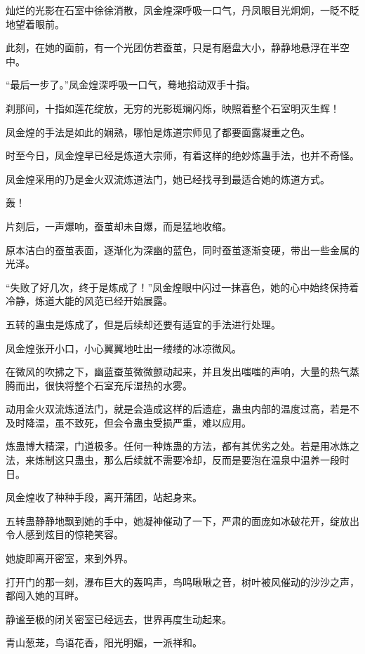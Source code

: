 
\begin{this_body}

灿烂的光影在石室中徐徐消散，凤金煌深呼吸一口气，丹凤眼目光炯炯，一眨不眨地望着眼前。

此刻，在她的面前，有一个光团仿若蚕茧，只是有磨盘大小，静静地悬浮在半空中。

“最后一步了。”凤金煌深呼吸一口气，蓦地掐动双手十指。

刹那间，十指如莲花绽放，无穷的光影斑斓闪烁，映照着整个石室明灭生辉！

凤金煌的手法是如此的娴熟，哪怕是炼道宗师见了都要面露凝重之色。

时至今日，凤金煌早已经是炼道大宗师，有着这样的绝妙炼蛊手法，也并不奇怪。

凤金煌采用的乃是金火双流炼道法门，她已经找寻到最适合她的炼道方式。

轰！

片刻后，一声爆响，蚕茧却未自爆，而是猛地收缩。

原本洁白的蚕茧表面，逐渐化为深幽的蓝色，同时蚕茧逐渐变硬，带出一些金属的光泽。

“失败了好几次，终于是炼成了！”凤金煌眼中闪过一抹喜色，她的心中始终保持着冷静，炼道大能的风范已经开始展露。

五转的蛊虫是炼成了，但是后续却还要有适宜的手法进行处理。

凤金煌张开小口，小心翼翼地吐出一缕缕的冰凉微风。

在微风的吹拂之下，幽蓝蚕茧微微颤动起来，并且发出嗤嗤的声响，大量的热气蒸腾而出，很快将整个石室充斥湿热的水雾。

动用金火双流炼道法门，就是会造成这样的后遗症，蛊虫内部的温度过高，若是不及时降温，虽不致死，但会令蛊虫受损严重，难以应用。

炼蛊博大精深，门道极多。任何一种炼蛊的方法，都有其优劣之处。若是用冰炼之法，来炼制这只蛊虫，那么后续就不需要冷却，反而是要泡在温泉中温养一段时日。

凤金煌收了种种手段，离开蒲团，站起身来。

五转蛊静静地飘到她的手中，她凝神催动了一下，严肃的面庞如冰破花开，绽放出令人感到炫目的惊艳笑容。

她旋即离开密室，来到外界。

打开门的那一刻，瀑布巨大的轰鸣声，鸟鸣啾啾之音，树叶被风催动的沙沙之声，都闯入她的耳畔。

静谧至极的闭关密室已经远去，世界再度生动起来。

青山葱茏，鸟语花香，阳光明媚，一派祥和。


\end{this_body}

